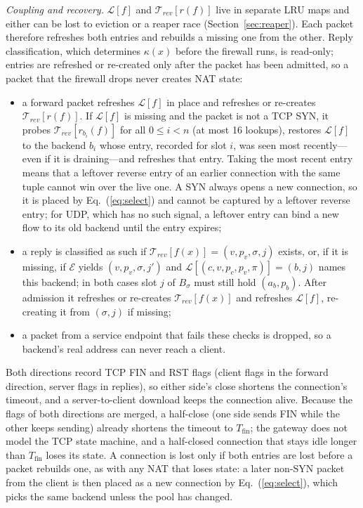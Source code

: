 \documentclass[conference]{IEEEtran}
\begin{document}
\textit{Coupling and recovery.} $\mathcal{L}[f]$ and $\mathcal{T}_{rev}[r(f)]$
live in separate LRU maps and either can be lost to eviction or a reaper race
(Section~\ref{sec:reaper}). Each packet therefore refreshes both entries and
rebuilds a missing one from the other. Reply classification, which
determines $\kappa(x)$ before the firewall runs, is read-only; entries are
refreshed or re-created only after the packet has been admitted, so a packet
that the firewall drops never creates NAT state:
\begin{itemize}
\item a forward packet refreshes $\mathcal{L}[f]$ in place and refreshes or
re-creates $\mathcal{T}_{rev}[r(f)]$. If $\mathcal{L}[f]$ is missing and the
packet is not a TCP SYN, it probes $\mathcal{T}_{rev}[r_{b_i}(f)]$ for
all $0 \le i < n$ (at most 16 lookups), restores $\mathcal{L}[f]$ to the
backend $b_i$ whose entry, recorded for slot $i$, was seen most recently---even
if it is draining---and refreshes that entry. Taking the most recent entry
means that a leftover reverse entry of an earlier connection with the same
tuple cannot win over the live one. A SYN always opens a new connection, so
it is placed by Eq.~(\ref{eq:select}) and cannot be captured by a leftover
reverse entry; for UDP, which has no such signal, a leftover entry can bind a
new flow to its old backend until the entry expires;
\item a reply is classified as such if $\mathcal{T}_{rev}[f(x)] =
(v,p_v,\sigma,j)$ exists, or, if it is missing, if $\mathcal{E}$ yields
$(v,p_v,\sigma,j')$ and $\mathcal{L}[(c,v,p_c,p_v,\pi)] = (b,j)$ names this
backend; in both cases slot $j$ of $B_\sigma$ must still hold $(a_b,p_b)$.
After admission it refreshes or re-creates $\mathcal{T}_{rev}[f(x)]$ and
refreshes $\mathcal{L}[f]$, re-creating it from $(\sigma,j)$ if missing;
\item a packet from a service endpoint that fails these checks is dropped,
so a backend's real address can never reach a client.
\end{itemize}
Both directions record TCP FIN and RST flags (client flags in the forward
direction, server flags in replies), so either side's close shortens the
connection's timeout, and a server-to-client download keeps the connection
alive. Because the flags of both directions are merged, a half-close (one
side sends FIN while the other keeps sending) already shortens the timeout to
$T_{\mathrm{fin}}$; the gateway does not model the TCP state machine, and a
half-closed connection that stays idle longer than $T_{\mathrm{fin}}$ loses
its state. A connection is lost only if both entries are lost before a packet
rebuilds one, as with any NAT that loses state: a later non-SYN packet from
the client is then placed as a new connection by Eq.~(\ref{eq:select}), which
picks the same backend unless the pool has changed.
\end{document}
